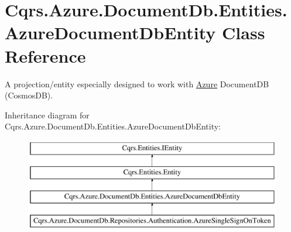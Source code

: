 \hypertarget{classCqrs_1_1Azure_1_1DocumentDb_1_1Entities_1_1AzureDocumentDbEntity}{}\section{Cqrs.\+Azure.\+Document\+Db.\+Entities.\+Azure\+Document\+Db\+Entity Class Reference}
\label{classCqrs_1_1Azure_1_1DocumentDb_1_1Entities_1_1AzureDocumentDbEntity}


A projection/entity especially designed to work with \hyperlink{namespaceCqrs_1_1Azure}{Azure} Document\+DB (Cosmos\+DB).  


Inheritance diagram for Cqrs.\+Azure.\+Document\+Db.\+Entities.\+Azure\+Document\+Db\+Entity\+:\begin{figure}[H]
\begin{center}
\leavevmode
\includegraphics[height=4.000000cm]{classCqrs_1_1Azure_1_1DocumentDb_1_1Entities_1_1AzureDocumentDbEntity}
\end{center}
\end{figure}
